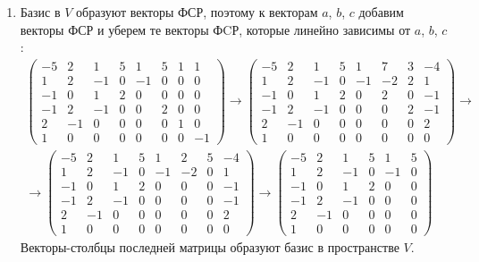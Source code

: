 \documentclass[12pt]{article}
\begin{document}
\begin{enumerate}
        \item
        Базис в $V$ образуют векторы ФСР, поэтому к векторам $a$, $b$, $c$ добавим векторы ФСР и уберем те векторы ФCР, которые линейно зависимы от $a$, $b$, $c$:
        \begin{gather*}
            \begin{pmatrix}
                -5 & 2  & 1  & 5 & 1  & 5 & 1 & 1  \\
                1  & 2  & -1 & 0 & -1 & 0 & 0 & 0  \\
                -1 & 0  & 1  & 2 & 0  & 0 & 0 & 0  \\
                -1 & 2  & -1 & 0 & 0  & 2 & 0 & 0  \\
                2  & -1 & 0  & 0 & 0  & 0 & 1 & 0  \\
                1  & 0  & 0  & 0 & 0  & 0 & 0 & -1
            \end{pmatrix}
            \rightarrow
            \begin{pmatrix}
                -5 & 2  & 1  & 5 & 1  & 7  & 3 & -4 \\
                1  & 2  & -1 & 0 & -1 & -2 & 2 & 1  \\
                -1 & 0  & 1  & 2 & 0  & 2  & 0 & -1 \\
                -1 & 2  & -1 & 0 & 0  & 0  & 2 & -1 \\
                2  & -1 & 0  & 0 & 0  & 0  & 0 & 2  \\
                1  & 0  & 0  & 0 & 0  & 0  & 0 & 0
            \end{pmatrix}
            \rightarrow \\
            \rightarrow
            \begin{pmatrix}
                -5 & 2  & 1  & 5 & 1  & 2  & 5 & -4 \\
                1  & 2  & -1 & 0 & -1 & -2 & 0 & 1  \\
                -1 & 0  & 1  & 2 & 0  & 0  & 0 & -1 \\
                -1 & 2  & -1 & 0 & 0  & 0  & 0 & -1 \\
                2  & -1 & 0  & 0 & 0  & 0  & 0 & 2  \\
                1  & 0  & 0  & 0 & 0  & 0  & 0 & 0
            \end{pmatrix}
            \rightarrow
            \begin{pmatrix}
                -5 & 2  & 1  & 5 & 1  & 5 \\
                1  & 2  & -1 & 0 & -1 & 0 \\
                -1 & 0  & 1  & 2 & 0  & 0 \\
                -1 & 2  & -1 & 0 & 0  & 0 \\
                2  & -1 & 0  & 0 & 0  & 0 \\
                1  & 0  & 0  & 0 & 0  & 0
            \end{pmatrix}
        \end{gather*}
        Векторы-столбцы последней матрицы образуют базис в пространстве $V$.
    \end{enumerate}
\end{document}
